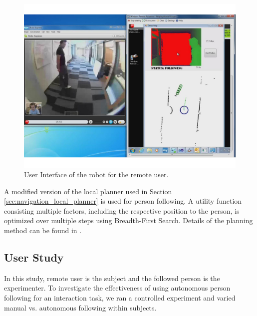 \begin{figure}[h!]
\centering
\includegraphics[width=1.0\textwidth]{pics/telepresence_ui_cropped}
\caption{User Interface of the robot for the remote user.}
\label{fig:telepresence_ui}
\end{figure}

A modified version of the local planner used in Section \ref{sec:navigation_local_planner} is used for person following. A utility function consisting multiple factors, including the respective position to the person, is optimized over multiple steps using Breadth-First Search. Details of the planning method can be found in \cite{cosgun2013autonomous}.

\subsection{User Study}

In this study, remote user is the subject and the followed person is the experimenter. To investigate the effectiveness of using autonomous person following for an interaction task, we ran a controlled experiment and varied manual vs. autonomous following within subjects.

